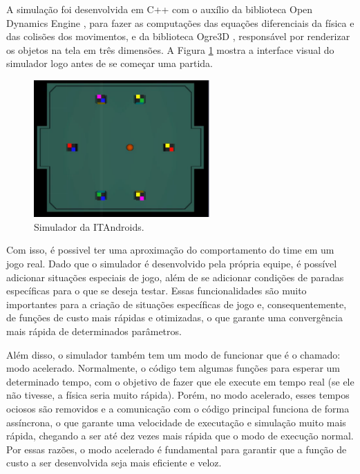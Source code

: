 \documentclass[a4paper,12pt]{article}
\begin{document}
A simulação foi desenvolvida em C++ com o auxílio da biblioteca Open Dynamics Engine \cite{ODE}, para fazer as computações das equações diferenciais da física e das colisões dos movimentos, e da biblioteca Ogre3D \cite{Ogre}, responsável por renderizar os objetos na tela em três dimensões. A Figura \ref{fig:simulator} mostra a interface visual do simulador logo antes de se começar uma partida.

\begin{figure}[H]
	\centering
	\includegraphics[width=0.6\textwidth]{figures/SimulatorWithoutButtons.png}
	\caption{Simulador da ITAndroids.}
	\label{fig:simulator}
\end{figure}


Com isso, é possivel ter uma aproximação do comportamento do time em um jogo real. Dado que o simulador é desenvolvido pela própria equipe, é possível adicionar situações especiais de jogo, além de se adicionar condições de paradas específicas para o que se deseja testar. Essas funcionalidades são muito importantes para a criação de situações específicas de jogo e, consequentemente, de funções de custo mais rápidas e otimizadas, o que garante uma convergência mais rápida de determinados parâmetros.

Além disso, o simulador também tem um modo de funcionar que é o chamado: modo acelerado. Normalmente, o código tem algumas funções para esperar um determinado tempo, com o objetivo de fazer que ele execute em tempo real (se ele não tivesse, a física seria muito rápida). Porém, no modo acelerado, esses tempos ociosos são removidos e a comunicação com o código principal funciona de forma assíncrona, o que garante uma velocidade de executação e simulação muito mais rápida, chegando a ser até dez vezes mais rápida que o modo de execução normal. Por essas razões, o modo acelerado é fundamental para garantir que a função de custo a ser desenvolvida seja mais eficiente e veloz.
\end{document}

